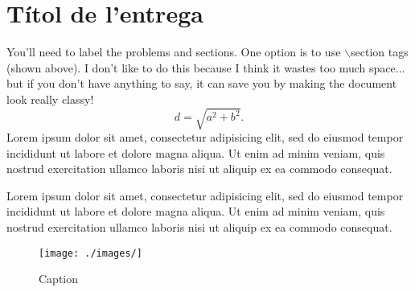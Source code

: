 \setcounter{section}{0}
\section{Títol de l'entrega} %
You'll need to label the problems and sections.  One option is to use $\backslash$section tags (shown above).  I don't like to do this because I think it wastes too much space... but if you don't have anything to say, it can save you by making the document look really classy!
\begin{equation}
d = \sqrt{a^2+b^2}.
\end{equation}
Lorem ipsum dolor sit amet, consectetur adipisicing elit, sed do eiusmod tempor incididunt ut labore et dolore magna aliqua. Ut enim ad minim veniam, quis nostrud exercitation ullamco laboris nisi ut aliquip ex ea commodo consequat.

Lorem ipsum dolor sit amet, consectetur adipisicing elit, sed do eiusmod tempor incididunt ut labore et dolore magna aliqua. Ut enim ad minim veniam, quis nostrud exercitation ullamco laboris nisi ut aliquip ex ea commodo consequat.

\begin{figure}[H]
	\centering
	\texttt{[image: ./images/]}
	\caption{Caption}
	\label{fig:}
\end{figure}
